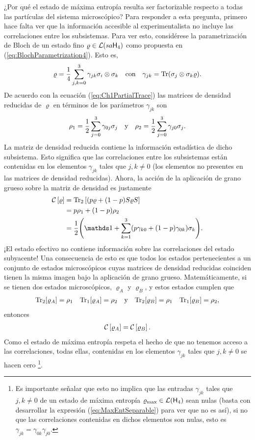 ¿Por qué el estado de máxima entropía resulta ser factorizable respecto a todas las partículas del sistema microscópico? Para responder a esta pregunta, primero hace falta ver que la información accesible al experimentalista no incluye las correlaciones entre los subsistemas. Para ver esto, considérese la parametrización de Bloch de un estado fino $\varrho\in\mathcal{L}(sa{\sf H}_{4})$ como propuesta en (\ref{eq:BlochParametrization4}). Esto es,
\begin{align}\label{}
    \varrho=\frac{1}{4}\sum_{j,k=0}^{3}\gamma_{jk}\sigma_{i}\otimes \sigma_{k} & & \text{con} & & \gamma_{jk}=\Tr(\sigma_{j}\otimes \sigma_{k}\varrho).\nonumber
\end{align}
De acuerdo con la ecuación (\ref{eq:Ch1PartialTrace}) las matrices de densidad reducidas de $\varrho$ en términos de los parámetros $\gamma_{jk}$ son
\begin{align}
    \rho_{1}=\frac{1}{2}\sum_{j=0}^{3}\gamma_{0j}\sigma_{j} & & \text{y} & & \rho_{2}=\frac{1}{2}\sum_{j=0}^{3}\gamma_{j0}\sigma_{j}.\nonumber
\end{align}
La matriz de densidad reducida contiene la información estadística de dicho subsistema. Esto significa que las correlaciones entre los subsistemas están contenidas en los elementos $\gamma_{jk}$ tales que $j,k\neq 0$ (los elementos no presentes en las matrices de densidad reducidas). Ahora, la acción de la aplicación de grano grueso sobre la matriz de densidad es justamente
\begin{align}
    \CG{\varrho}&=\Tr_{2}\qty[(p \varrho + (1-p)S\varrho S]\nonumber\\
    &=p\rho_{1}+(1-p)\rho_{2}\nonumber\\
    &=\frac{1}{2}\qty(\Id+\sum_{k=1}^{3}(p\gamma_{k0}+(1-p)\gamma_{0k})\sigma_{k}).\nonumber
\end{align}
¡El estado efectivo no contiene información sobre las correlaciones del estado subyacente! Una consecuencia de esto es que todos los estados pertenecientes a un conjunto de estados microscópicos cuyas matrices de densidad reducidas coinciden tienen la misma imagen bajo la aplicación de grano grueso. Matemáticamente, si se tienen dos estados microscópicos, $\varrho_{A}$ y $\varrho_{B}$, y estos estados cumplen que
\begin{align}
    \Tr_{2}[\varrho_{A}]=\rho_{1} & & \Tr_{1}[\varrho_{A}]=\rho_{2} & & \text{y} & &\Tr_{2}[\varrho_{B}]=\rho_{1} & & \Tr_{1}[\varrho_{B}]=\rho_{2},\nonumber
\end{align}
entonces
\begin{align}
    \mathcal{C}\left[\varrho_{A}\right]=\mathcal{C}\left[\varrho_{B}\right].\nonumber
\end{align}
Como el estado de máxima entropía respeta el hecho de que no tenemos acceso a las correlaciones, todas ellas, contenidas en los elementos $\gamma_{jk}$ tales que $j,k\neq 0$ se hacen cero \footnote{Es importante señalar que esto no implica que las entradas $\gamma_{jk}$ tales que $j,k\neq 0$ de un estado de máxima entropía $\varrho_{\max}\in\mathcal{L}({\sf H}_{4})$ sean nulas (basta con desarrollar la expresión (\ref{eq:MaxEntSeparable}) para ver que no es así), si no que las correlaciones contenidas en dichos elementos son nulas, esto es $\gamma_{jk}=\gamma_{0k}\gamma_{j0}$.}. 


